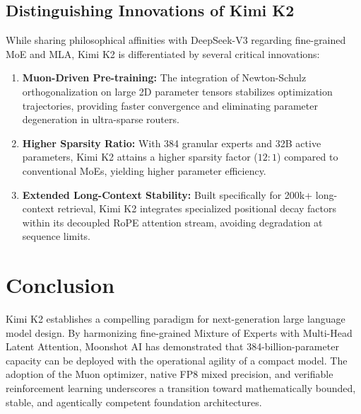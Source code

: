 \documentclass[conference]{IEEEtran}
\begin{document}
\subsection{Distinguishing Innovations of Kimi K2}
While sharing philosophical affinities with DeepSeek-V3 regarding fine-grained MoE and MLA, Kimi K2 is differentiated by several critical innovations:
\begin{enumerate}
    \item \textbf{Muon-Driven Pre-training:} The integration of Newton-Schulz orthogonalization on large 2D parameter tensors stabilizes optimization trajectories, providing faster convergence and eliminating parameter degeneration in ultra-sparse routers.
    \item \textbf{Higher Sparsity Ratio:} With 384 granular experts and 32B active parameters, Kimi K2 attains a higher sparsity factor ($12:1$) compared to conventional MoEs, yielding higher parameter efficiency.
    \item \textbf{Extended Long-Context Stability:} Built specifically for 200k+ long-context retrieval, Kimi K2 integrates specialized positional decay factors within its decoupled RoPE attention stream, avoiding degradation at sequence limits.
\end{enumerate}

\section{Conclusion}
Kimi K2 establishes a compelling paradigm for next-generation large language model design. By harmonizing fine-grained Mixture of Experts with Multi-Head Latent Attention, Moonshot AI has demonstrated that 384-billion-parameter capacity can be deployed with the operational agility of a compact model. The adoption of the Muon optimizer, native FP8 mixed precision, and verifiable reinforcement learning underscores a transition toward mathematically bounded, stable, and agentically competent foundation architectures.
\end{document}
